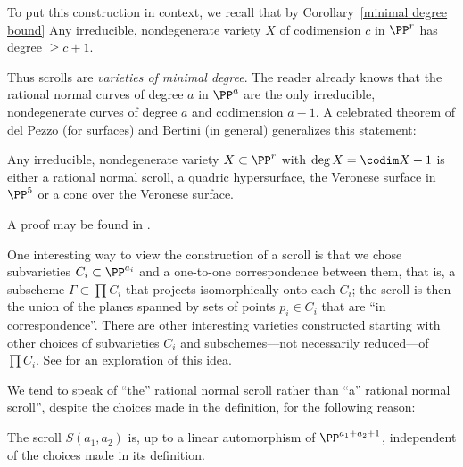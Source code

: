 
To put this construction in context, we recall that by Corollary~\ref{minimal degree bound}
 Any irreducible, nondegenerate variety $X$ of codimension $c$ in $\PP^{r}$ has degree $\geq c +1$.

Thus scrolls are \emph{varieties of minimal degree}. The reader already knows that the rational normal curves of degree $a$ in $\PP^{a}$ are the only irreducible, nondegenerate curves of degree $a$ and codimension $a-1$. A celebrated theorem of del Pezzo (for surfaces) and Bertini (in general) generalizes this statement:

\begin{fact}\label{classification of scrolls} 
Any irreducible, nondegenerate variety $X\subset \PP^{r}$  with $\deg X = \codim X+1$ is either a rational normal scroll, a quadric hypersurface, the Veronese surface in $\PP^{5}$ or a cone over the Veronese surface.
\end{fact}

A proof may be found in \cite{Eisenbud-Harris-Centennial}.

One interesting way to view the construction of a scroll is that we chose subvarieties $C_{i}\subset \PP^{a_{i}}$ and a one-to-one correspondence between them, that is, a subscheme
$\Gamma\subset \prod C_{i}$ that projects isomorphically onto each $C_{i}$; the scroll is then the
union of the planes spanned by sets of points $p_{i}\in C_{i}$ that are ``in correspondence''. There are other interesting varieties constructed starting with other choices of subvarieties $C_{i}$ and subschemes---not necessarily reduced---of $\prod C_{i}$. See \cite{Eisenbud-Sammartano} for an exploration of this idea.

We tend to speak of ``the'' rational normal scroll rather than ``a'' rational normal scroll'', despite the choices made in the definition, for the following reason:

\begin{proposition}\label{uniqueness of scrolls}
The scroll $S(a_1,a_2)$ is, up to a linear automorphism of $\PP^{a_1+a_2+1}$, independent of the choices made in its
 definition. 
\end{proposition}

